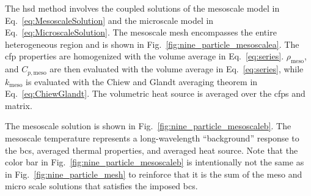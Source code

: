 The \gls{hsd} method involves the coupled solutions of the mesoscale model in Eq.\ \eqref{eq:MesoscaleSolution} and the microscale model in Eq.\ \eqref{eq:MicroscaleSolution}. The mesoscale mesh encompasses the entire heterogeneous region and is shown in Fig.\ \ref{fig:nine_particle_mesoscalea}. The \gls{cfp} properties are homogenized with the volume average in Eq.\ \eqref{eq:series}. \(\rho_\text{meso}\), and \(C_{p,\text{meso}}\) are then evaluated with the volume average in Eq.\ \eqref{eq:series}, while \(k_\text{meso}\) is evaluated with the Chiew and Glandt averaging theorem in Eq.\ \eqref{eq:ChiewGlandt}. The volumetric heat source is averaged over the \glspl{cfp} and matrix.

The mesoscale solution is shown in Fig.\ \ref{fig:nine_particle_mesoscaleb}. The mesoscale temperature represents a long-wavelength ``background'' response to the \glspl{bc}, averaged thermal properties, and averaged heat source. Note that the color bar in Fig.\ \ref{fig:nine_particle_mesoscaleb} is intentionally not the same as in Fig.\ \ref{fig:nine_particle_mesh} to reinforce that it is the sum of the meso and micro scale solutions that satisfies the imposed \glspl{bc}.

